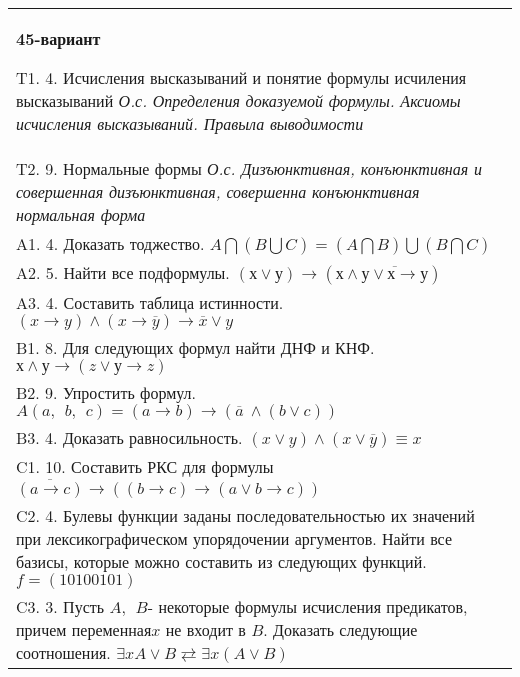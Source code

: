 \documentclass{article}
\begin{document}
\begin{tabular}{m{17cm}}
\textbf{45-вариант}
\newline

T1. 4. Исчисления высказываний и понятие формулы исчиления высказываний \emph{О.с. Определения доказуемой формулы. Аксиомы исчисления высказываний. Правыла выводимости} \\
T2. 9. Нормальные формы \emph{О.с. Дизъюнктивная, конъюнктивная и совершенная дизъюнктивная, совершенна конъюнктивная нормальная форма} \\
A1. 4. Доказать тоджество. \(A\bigcap(B\bigcup C) = (A\bigcap B)\bigcup(B\bigcap C)\) \\
A2. 5. Найти все подформулы. \((х \vee у) \rightarrow \left( х \land \overline{у \vee х \rightarrow у} \right)\) \\
A3. 4. Составить таблица истинности. \((x \rightarrow y) \land (x \rightarrow \overline{y}) \rightarrow \overline{x} \vee y\) \\
B1. 8. Для следующих формул найти ДНФ и КНФ. \(х \land у \rightarrow (z \vee у \rightarrow z)\) \\
B2. 9. Упростить формул. \(A(a,\ \ b,\ \ c) = (a \rightarrow b) \rightarrow (\overline{a}\  \land (b \vee c))\) \\
B3. 4. Доказать равносильность. \((x \vee y) \land (x \vee \overline{y}) \equiv x\) \\
C1. 10. Составить РКС для формулы \(\overline{(a \rightarrow c)} \rightarrow \left( (b \rightarrow c) \rightarrow (a \vee b \rightarrow c) \right)\) \\
C2. 4. Булевы функции заданы последовательностью их значений при лексикографическом упорядочении аргументов. Найти все базисы, которые можно составить из следующих функций. \(f = (10100101)\) \\
C3. 3. Пусть \(A,\ \ B\)- некоторые формулы исчисления предикатов, причем переменная\(x\) не входит в \(B\). Доказать следующие соотношения. \(\exists xA \vee B \rightleftarrows \exists x(A \vee B)\) \\

\end{tabular}
\vspace{1cm}
\end{document}
